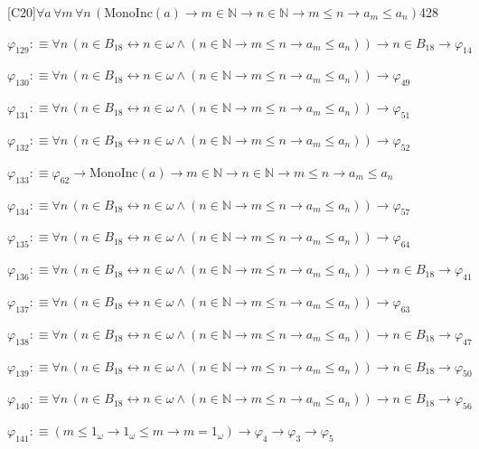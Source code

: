 \begin{fullproof}{[C20]}{$\forall a\,\forall m\,\forall n\,(\mathrm{MonoInc}(a) \to m \in \mathbb{N} \to n \in \mathbb{N} \to m \leq n \to a_{m} \leq a_{n})$}{428}
\begin{abbrevlist}
\item $\varphi_{129} :\equiv \forall n\,(n \in B_{18} \leftrightarrow n \in \omega \land (n \in \mathbb{N} \to m \leq n \to a_{m} \leq a_{n})) \to n \in B_{18} \to \varphi_{14}$
\item $\varphi_{130} :\equiv \forall n\,(n \in B_{18} \leftrightarrow n \in \omega \land (n \in \mathbb{N} \to m \leq n \to a_{m} \leq a_{n})) \to \varphi_{49}$
\item $\varphi_{131} :\equiv \forall n\,(n \in B_{18} \leftrightarrow n \in \omega \land (n \in \mathbb{N} \to m \leq n \to a_{m} \leq a_{n})) \to \varphi_{51}$
\item $\varphi_{132} :\equiv \forall n\,(n \in B_{18} \leftrightarrow n \in \omega \land (n \in \mathbb{N} \to m \leq n \to a_{m} \leq a_{n})) \to \varphi_{52}$
\item $\varphi_{133} :\equiv \varphi_{62} \to \mathrm{MonoInc}(a) \to m \in \mathbb{N} \to n \in \mathbb{N} \to m \leq n \to a_{m} \leq a_{n}$
\item $\varphi_{134} :\equiv \forall n\,(n \in B_{18} \leftrightarrow n \in \omega \land (n \in \mathbb{N} \to m \leq n \to a_{m} \leq a_{n})) \to \varphi_{57}$
\item $\varphi_{135} :\equiv \forall n\,(n \in B_{18} \leftrightarrow n \in \omega \land (n \in \mathbb{N} \to m \leq n \to a_{m} \leq a_{n})) \to \varphi_{64}$
\item $\varphi_{136} :\equiv \forall n\,(n \in B_{18} \leftrightarrow n \in \omega \land (n \in \mathbb{N} \to m \leq n \to a_{m} \leq a_{n})) \to n \in B_{18} \to \varphi_{41}$
\item $\varphi_{137} :\equiv \forall n\,(n \in B_{18} \leftrightarrow n \in \omega \land (n \in \mathbb{N} \to m \leq n \to a_{m} \leq a_{n})) \to \varphi_{63}$
\item $\varphi_{138} :\equiv \forall n\,(n \in B_{18} \leftrightarrow n \in \omega \land (n \in \mathbb{N} \to m \leq n \to a_{m} \leq a_{n})) \to n \in B_{18} \to \varphi_{47}$
\item $\varphi_{139} :\equiv \forall n\,(n \in B_{18} \leftrightarrow n \in \omega \land (n \in \mathbb{N} \to m \leq n \to a_{m} \leq a_{n})) \to n \in B_{18} \to \varphi_{50}$
\item $\varphi_{140} :\equiv \forall n\,(n \in B_{18} \leftrightarrow n \in \omega \land (n \in \mathbb{N} \to m \leq n \to a_{m} \leq a_{n})) \to n \in B_{18} \to \varphi_{56}$
\item $\varphi_{141} :\equiv (m \leq 1_{\omega} \to 1_{\omega} \leq m \to m = 1_{\omega}) \to \varphi_{4} \to \varphi_{3} \to \varphi_{5}$

\end{abbrevlist}
\end{fullproof}
